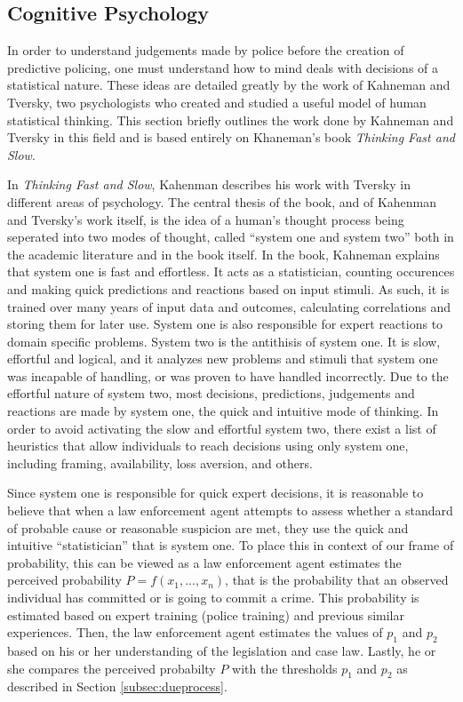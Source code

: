 \documentclass[12pt]{article} %
\begin{document}
\subsection{Cognitive Psychology} \label{subsec:cognitive}
In order to understand judgements made by police before the creation of predictive policing, one must understand how to mind deals with decisions of a statistical nature. These ideas are detailed greatly by the work of Kahneman and Tversky, two psychologists who created and studied a useful model of human statistical thinking. This section briefly outlines the work done by Kahneman and Tversky in this field and is based entirely on Khaneman's book \textit{Thinking Fast and Slow}.\cite{kahneman}

In \textit{Thinking Fast and Slow}, Kahenman describes his work with Tversky in different areas of psychology. The central thesis of the book, and of Kahenman and Tversky's work itself, is the idea of a human's thought process being seperated into two modes of thought, called ``system one and system two'' both in the academic literature and in the book itself. In the book, Kahneman explains that system one is fast and effortless. It acts as a statistician, counting occurences and making quick predictions and reactions based on input stimuli. As such, it is trained over many years of input data and outcomes, calculating correlations and storing them for later use. System one is also responsible for expert reactions to domain specific problems. System two is the antithisis of system one. It is slow, effortful and logical, and it analyzes new problems and stimuli that system one was incapable of handling, or was proven to have handled incorrectly. Due to the effortful nature of system two, most decisions, predictions, judgements and reactions are made by system one, the quick and intuitive mode of thinking. In order to avoid activating the slow and effortful system two, there exist a list of heuristics that allow individuals to reach decisions using only system one, including framing, availability, loss aversion, and others.

Since system one is responsible for quick expert decisions, it is reasonable to believe that when a law enforcement agent attempts to assess whether a standard of probable cause or reasonable suspicion are met, they use the quick and intuitive ``statistician'' that is system one. To place this in context of our frame of probability, this can be viewed as a law enforcement agent estimates the perceived probability $P = f(x_1,...,x_n)$, that is the probability that an observed individual has committed or is going to commit a crime. This probability is estimated based on expert training (police training) and previous similar experiences. Then, the law enforcement agent estimates the values of $p_1$ and $p_2$ based on his or her understanding of the legislation and case law. Lastly, he or she compares the perceived probabilty $P$ with the thresholds $p_1$ and $p_2$ as described in Section \ref{subsec:dueprocess}.
\end{document}
